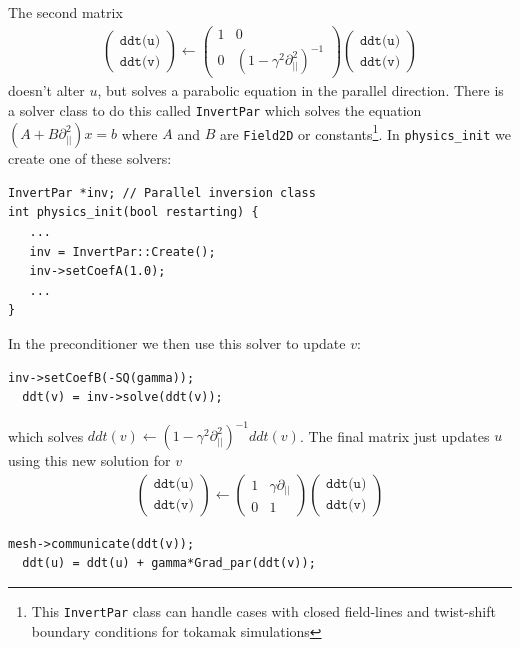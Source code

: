 \documentclass[12pt]{article}
\def\L{\left}
\def\R{\right}
\def\Larrow{\leftarrow}
\begin{document}
The second matrix
%
\begin{align}
\L(%
\begin{array}{c}
\texttt{ddt(u)} \\
\texttt{ddt(v)}
\end{array}
%
\R) \Larrow \L(%
\begin{array}{cc}
1 & 0 \\
0 & \L(1 - \gamma^2\partial^2_{||}\R)^{-1}
\end{array}
%
\R)\L(%
\begin{array}{c}
\texttt{ddt(u)} \\
\texttt{ddt(v)}
\end{array}
%
\R)
\end{align}
%
doesn't alter $u$, but solves a parabolic equation in the parallel direction.
There is a solver class to do this called \texttt{InvertPar} which solves the
equation $\L(A + B\partial_{||}^2\R)x = b$ where $A$ and $B$ are
%
\lstinline!Field2D! or constants\footnote{This \texttt{InvertPar} class can
handle cases with closed field-lines and twist-shift boundary conditions for
tokamak simulations}. In \lstinline!physics_init!
%
 we create one of these solvers:
%
\begin{lstlisting}[numbers=none]
InvertPar *inv; // Parallel inversion class
int physics_init(bool restarting) {
   ...
   inv = InvertPar::Create();
   inv->setCoefA(1.0);
   ...
}
\end{lstlisting}
%
In the preconditioner we then use this solver to update $v$:
%
\begin{lstlisting}[numbers=none]
  inv->setCoefB(-SQ(gamma));
  ddt(v) = inv->solve(ddt(v));
\end{lstlisting}
%
which solves $ddt(v) \Larrow \L(1 - \gamma^2\partial_{||}^2\R)^{-1}
ddt(v)$.  The final matrix just updates $u$ using this new solution for $v$
%
\begin{align}
\L(%
\begin{array}{c}
\texttt{ddt(u)} \\
\texttt{ddt(v)}
\end{array}
%
\R) \Larrow \L(%
\begin{array}{cc}
1 & \gamma\partial_{||} \\
0 & 1
\end{array}
%
\R)\L(%
\begin{array}{c}
\texttt{ddt(u)} \\
\texttt{ddt(v)}
\end{array}
%
\R)
\end{align}
%
\begin{lstlisting}[numbers=none]
  mesh->communicate(ddt(v));
  ddt(u) = ddt(u) + gamma*Grad_par(ddt(v));
\end{lstlisting}
\end{document}
